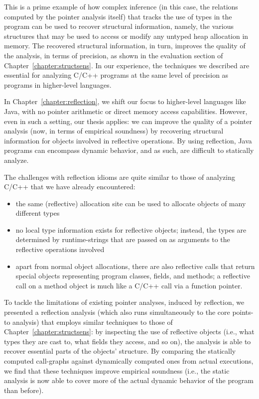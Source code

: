 This is a prime example of how complex inference (in this case, the
relations computed by the pointer analysis itself) that tracks the use
of types in the program can be used to recover structural information,
namely, the various structures that may be used to access or modify
any untyped heap allocation in memory. The recovered structural
information, in turn, improves the quality of the analysis, in terms
of precision, as shown in the evaluation section of
Chapter~\ref{chapter:structsens}. In our experience, the techniques we
described are essential for analyzing C/C++ programs at the same level
of precision as programs in higher-level languages.

In Chapter~\ref{chapter:reflection}, we shift our focus to
higher-level languages like Java, with no pointer arithmetic or direct
memory access capabilities. However, even in such a setting, our thesis
applies: we can improve the quality of a pointer analysis (now, in
terms of empirical soundness) by recovering structural information for
objects involved in reflective operations. By using reflection, Java
programs can encompass dynamic behavior, and as such, are difficult to
statically analyze.

The challenges with reflection idioms are quite similar to those of
analyzing C/C++ that we have already encountered:
\begin{itemize}[\(\cdot\)]
\item the same (reflective) allocation site can be used to allocate
  objects of many different types
\item no local type information exists for reflective objects;
  instead, the types are determined by runtime-strings that are passed
  on as arguments to the reflective operations involved
\item apart from normal object allocations, there are also reflective
  calls that return special objects representing program classes,
  fields, and methods; a reflective call on a method object is much
  like a C/C++ call via a function pointer.
\end{itemize}

To tackle the limitations of existing pointer analyses, induced by
reflection, we presented a reflection analysis (which also runs
simultaneously to the core points-to analysis) that employs similar
techniques to those of Chapter~\ref{chapter:structsens}: by inspecting
the use of reflective objects (i.e., what types they are cast to, what
fields they access, and so on), the analysis is able to recover
essential parts of the objects' structure.
%
By comparing the statically computed call-graphs against dynamically
computed ones from actual executions, we find that these techniques
improve empirical soundness (i.e., the static analysis is now able to
cover more of the actual dynamic behavior of the program than
before).

